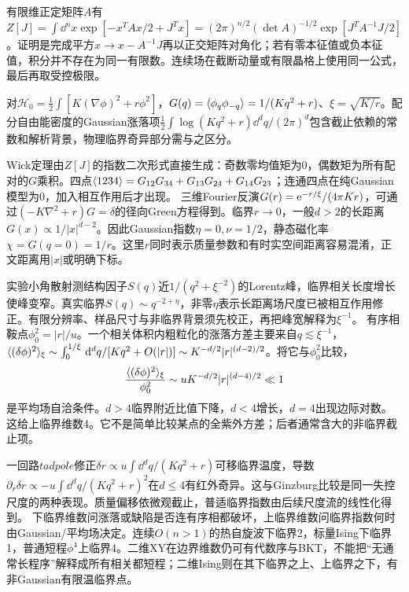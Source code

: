 \label{ch:gaussian}
有限维正定矩阵$A$有$Z[J]=\int\dd^nx\exp[-x^TAx/2+J^Tx]=(2\pi)^{n/2}(\det A)^{-1/2}\exp[J^TA^{-1}J/2]$。证明是完成平方$x\to x-A^{-1}J$再以正交矩阵对角化；若有零本征值或负本征值，积分并不存在为同一有限数。连续场在截断动量或有限晶格上使用同一公式，最后再取受控极限。

对$\mathcal H_0=\frac12\int[K(\nabla\phi)^2+r\phi^2]$，$G(q)=\langle \phi_q\phi_{-q}\rangle=1/(Kq^2+r)$、$\xi=\sqrt{K/r}$。配分自由能密度的Gaussian涨落项$\frac12\int\log(Kq^2+r)\dd^dq/(2\pi)^d$包含截止依赖的常数和解析背景，物理临界奇异部分需与之区分。

Wick定理由$Z[J]$的指数二次形式直接生成：奇数零均值矩为0，偶数矩为所有配对的$G$乘积。四点$\langle 1234\rangle=G_{12}G_{34}+G_{13}G_{24}+G_{14}G_{23}$；连通四点在纯Gaussian模型为0，加入相互作用后才出现。
三维Fourier反演$G(r)=\mathrm e^{-r/\xi}/(4\pi Kr)$，可通过$(-K\nabla^2+r)G=\delta$的径向Green方程得到。临界$r\to0$，一般$d>2$的长距离$G(x)\propto1/|x|^{d-2}$。因此Gaussian指数$\eta=0,\nu=1/2$，静态磁化率$\chi=G(q=0)=1/r$。这里$r$同时表示质量参数和有时实空间距离容易混淆，正文距离用$|x|$或明确下标。

实验小角散射测结构因子$S(q)$近$1/(q^2+\xi^{-2})$的Lorentz峰，临界相关长度增长使峰变窄。真实临界$S(q)\sim q^{-2+\eta}$，非零$\eta$表示长距离场尺度已被相互作用修正。有限分辨率、样品尺寸与非临界背景须先校正，再把峰宽解释为$\xi^{-1}$。
有序相鞍点$\phi_0^2=|r|/u$。一个相关体积内粗粒化的涨落方差主要来自$q\lesssim\xi^{-1}$，$\langle (\delta\phi)^2\rangle_\xi\sim\int_0^{1/\xi}\,\mathrm d^dq/[Kq^2+O(|r|)]\sim K^{-d/2}|r|^{(d-2)/2}$。将它与$\phi_0^2$比较，
\begin{equation}
\frac{\langle (\delta\phi)^2\rangle_\xi}{\phi_0^2}\sim uK^{-d/2}|r|^{(d-4)/2}\ll1
\end{equation}
是平均场自洽条件。$d>4$临界附近比值下降，$d<4$增长，$d=4$出现边际对数。这给上临界维数4。它不是简单比较某点的全紫外方差；后者通常含大的非临界截止项。

一回路$tadpole$修正$\delta r\propto u\int\dd^dq/(Kq^2+r)$可移临界温度，导数$\partial_r\delta r\propto-u\int\dd^dq/(Kq^2+r)^2$在$d\le4$有红外奇异。这与Ginzburg比较是同一失控尺度的两种表现。质量偏移依微观截止，普适临界指数由后续尺度流的线性化得到。
下临界维数问涨落或缺陷是否连有序相都破坏，上临界维数问临界指数何时由Gaussian/平均场决定。连续$O(n>1)$的热自旋波下临界2，标量Ising下临界1，普通短程$\phi^4$上临界4。二维XY在边界维数仍可有代数序与BKT，不能把“无通常长程序”解释成所有相关都短程；二维Ising则在其下临界之上、上临界之下，有非Gaussian有限温临界点。
